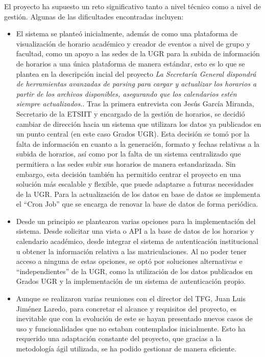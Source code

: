 El proyecto ha supuesto un reto significativo tanto a nivel técnico como a nivel de gestión. Algunas de las dificultades encontradas incluyen:
\begin{itemize}
    \item El sistema se planteó inicialmente, además de como una plataforma de visualización de horario académico y creador de eventos a nivel de grupo y facultad, como un apoyo a las sedes de la UGR para la subida de información de horarios a una única plataforma de manera estándar, esto es lo que se plantea en la descripción incial del proyecto \textit{La Secretaría General dispondrá de herramientas avanzadas de parsing para cargar y actualizar los horarios a partir de los archivos disponibles, asegurando que los calendarios estén siempre actualizados.}. Tras la primera entrevista con Jesús García Miranda, Secretario de la ETSIIT y encargado de la gestión de horarios, se decidió cambiar de dirección hacia un sistema que utilizara los datos ya publicados en un punto central (en este caso Grados UGR).
    Esta decisión se tomó por la falta de información en cuanto a la generación, formato y fechas relativas a la subida de horarios, así como por la falta de un sistema centralizado que permitiera a las sedes subir sus horarios de manera estandarizada.
    Sin embargo, esta decisión también ha permitido centrar el proyecto en una solución más escalable y flexible, que puede adaptarse a futuras necesidades de la UGR. Para la actualización de los datos en base de datos se implementa el ``Cron Job'' que se encarga de renovar la base de datos de forma periódica.

    \item Desde un principio se plantearon varias opciones para la implementación del sistema. Desde solicitar una vista o API a la base de datos de los horarios y calendario académico, desde integrar el sistema de autenticación institucional u obtener la información relativa a las matriculaciones. Al no poder tener acceso a ninguna de estas opciones, se optó por soluciones alternativas e ``independientes'' de la UGR, como la utilización de los datos publicados en Grados UGR y la implementación de un sistema de autenticación propio.
    \item Aunque se realizaron varias reuniones con el director del TFG, Juan Luis Jiménez Laredo, para concretar el alcance y requisitos del proyecto, es inevitable que con la evolución de este se hayan presentado nuevos casos de uso y funcionalidades que no estaban contemplados inicialmente. Esto ha requerido una adaptación constante del proyecto, que gracias a la metodología ágil utilizada, se ha podido gestionar de manera eficiente.
\end{itemize}

